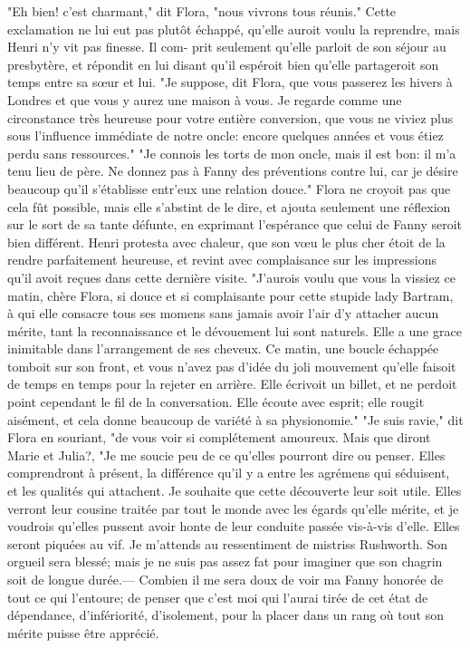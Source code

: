 "Eh bien! c'est charmant," dit Flora, "nous vivrons tous réunis."
Cette exclamation ne lui eut pas plutôt échappé, qu'elle auroit voulu la reprendre, mais Henri n'y vit pas finesse. Il com-\setcounter{page}{260} prit seulement qu'elle parloit de son séjour au presbytère, et répondit en lui disant qu'il espéroit bien qu'elle partageroit son temps entre sa sœur et lui.
"Je suppose, dit Flora, que vous passerez les hivers à Londres et que vous y aurez une maison à vous. Je regarde comme une circonstance très heureuse pour votre entière conversion, que vous ne viviez plus sous l'influence immédiate de notre oncle: encore quelques années et vous étiez perdu sans ressources."
"Je connois les torts de mon oncle, mais il est bon: il m'a tenu lieu de père. Ne donnez pas à Fanny des préventions contre lui, car je désire beaucoup qu'il s'établisse entr'eux une relation douce."
Flora ne croyoit pas que cela fût possible, mais elle s'abstint de le dire, et ajouta seulement une réflexion sur le sort de sa tante défunte, en exprimant l'espérance que celui de Fanny seroit bien différent. Henri protesta avec chaleur, que son vœu le plus cher étoit de la rendre parfaitement heureuse, et revint avec complaisance sur les impressions qu'il avoit reçues dans cette dernière visite.
"J'aurois voulu que vous la vissiez ce matin,\setcounter{page}{261} chère Flora, si douce et si complaisante pour cette stupide lady Bartram, à qui elle consacre tous ses momens sans jamais avoir l'air d'y attacher aucun mérite, tant la reconnaissance et le dévouement lui sont naturels. Elle a une grace inimitable dans l'arrangement de ses cheveux. Ce matin, une boucle échappée tomboit sur son front, et vous n'avez pas d'idée du joli mouvement qu'elle faisoit de temps en temps pour la rejeter en arrière. Elle écrivoit un billet, et ne perdoit point cependant le fil de la conversation. Elle écoute avec esprit; elle rougit aisément, et cela donne beaucoup de variété à sa physionomie."
"Je suis ravie," dit Flora en souriant, "de vous voir si complétement amoureux. Mais que diront Marie et Julia?,
"Je me soucie peu de ce qu'elles pourront dire ou penser. Elles comprendront à présent, la différence qu'il y a entre les agrémens qui séduisent, et les qualités qui attachent. Je souhaite que cette découverte leur soit utile. Elles verront leur cousine traitée par tout le monde avec les égards qu'elle mérite, et je voudrois qu'elles pussent avoir honte de leur conduite passée vis-à-vis d'elle. Elles seront piquées au vif. Je\setcounter{page}{262} m'attends au ressentiment de mistriss Rushworth. Son orgueil sera blessé; mais je ne suis pas assez fat pour imaginer que son chagrin soit de longue durée.— Combien il me sera doux de voir ma Fanny honorée de tout ce qui l'entoure; de penser que c'est moi qui l'aurai tirée de cet état de dépendance, d'infériorité, d'isolement, pour la placer dans un rang où tout son mérite puisse être apprécié.
